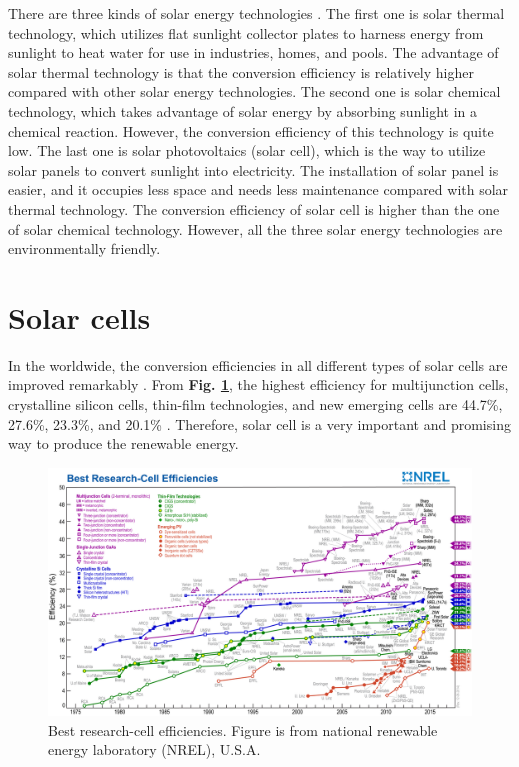 \documentclass[a4paper, 12pt, titlepage,oneside,drop]{kthesis}
\begin{document}
There are three kinds of solar energy technologies \cite{boyle2004renewable,Chiras201007}. The first one is solar thermal technology, which utilizes flat sunlight collector plates to harness energy from sunlight to heat water
for use in industries, homes, and pools. The advantage of solar thermal technology is that the conversion efficiency is relatively higher compared with other solar energy technologies. The second one is 
solar chemical technology, which takes advantage of solar energy by absorbing sunlight in a chemical reaction. However, the conversion efficiency of this technology is quite low. The last one is solar photovoltaics (solar cell), which is the way
to utilize solar panels to convert sunlight into electricity. The installation of solar panel is easier, and it occupies less space and needs less maintenance compared with solar thermal technology.
The conversion efficiency of solar cell is higher than the one of solar chemical technology. However, all the three solar energy technologies are environmentally friendly.


\section{Solar cells}
In the worldwide, the conversion efficiencies in all different types of solar cells are improved remarkably \cite{nrel}. From \textbf{Fig. \ref{nrel}}, the highest efficiency for multijunction cells, crystalline silicon cells,
thin-film technologies, and new emerging cells are 44.7\%, 27.6\%, 23.3\%, and 20.1\% \cite{dimroth2014wafer, jones2009new, ward2014cu, green2015solar}. Therefore, solar cell is a very important and promising way to produce the renewable energy.


\begin{figure}
\captionsetup{width=1\textwidth}
\centering
\includegraphics[scale=0.7]{efficiency_chart.jpg}
\caption{Best research-cell efficiencies. Figure is from national renewable energy laboratory (NREL), U.S.A. \cite{nrel}}
\label{nrel}
\end{figure}
\end{document}
